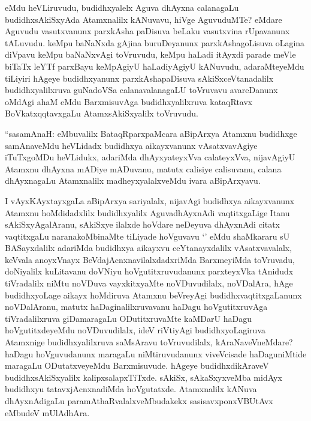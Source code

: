 \begin{artha}%
\stext eMdu heVLiruvudu, budidhxyalelx Aguva dhAyxna calanagaLu budidhxsAkiSxyAda Atamxnalilx kANuvavu, hiVge AguvuduMTe? eMdare Aguvudu vasutxvanunx parxkAsha paDisuva beLaku vasutxvina rUpavanunx tALuvudu. keMpu baNaNxda gAjina buruDeyanunx parxkAshagoLisuva oLagina diVpavu keMpu baNaNxvAgi toVruvudu, keMpu haLadi itAyxdi parade meVle biTaTx leYTf parxBayu keMpAgiyU haLadiyAgiyU kANuvudu, adaraMteyeMdu tiLiyiri hAgeye budidhxyanunx parxkAshapaDisuva sAkiSxceVtanadalilx budidhxyalilxruva guNadoVSa calanavalanagaLU toVruvavu avareDanunx oMdAgi ahaM eMdu BarxmisuvAga budidhxyalilxruva kataqRtavx BoVkatxqqtavxgaLu AtamxsAkiSxyalilx toVruvudu. 
\end{artha}

\begin{artha}
``sasamAnaH: eMbuvalilx BataqRparxpaMcara aBipArxya Atamxnu budidhxge samAnaveMdu heVLidadx budidhxya aikayxvanunx vAsatxvavAgiye iTuTxgoMDu heVLidukx, adariMda dhAyxyateyxVva calateyxVva, nijavAgiyU Atamxnu dhAyxna mADiye mADuvanu, matutx calisiye calisuvanu, calana dhAyxnagaLu Atamxnalilx madheyxyalalxveMdu ivara aBipArxyavu.

I vAyxKAyxtayxgaLa aBipArxya sariyalalx, nijavAgi budidhxya aikayxvanunx Atamxnu hoMdidadxlilx budidhxyalilx AguvadhAyxnAdi vaqtitxgaLige Itanu sAkiSxyAgalAranu, sAkiSxye ilalxde hoVdare neDeyuva dhAyxnAdi citatx vaqtitxgaLu naranakoMbinaMte tiLiyade hoVguvavu `\stext ' eMdu shaMkararu sU BASayxdalilx adariMda budidhxya aikayxvu ceYtanayxdalilx vAsatxvavalalx, keVvala anoyxVnayx BeVdajAcnxnavilalxdadxriMda BarxmeyiMda toVruvadu, doNiyalilx kuLitavanu doVNiyu hoVgutitxruvudanunx parxteyxVka tAnidudx tiVradalilx niMtu noVDuva vayxkitxyaMte noVDuvudilalx, noVDalAra, hAge budidhxyoLage aikayx hoMdiruva Atamxnu beVreyAgi budidhxvaqtitxgaLanunx noVDalAranu, matutx haDaginalilxruvavanu haDagu hoVgutitxruvAga tiVradalilxruva giDamaragaLu ODutitxruvaMte kaMDarU haDagu hoVgutitxdeyeMdu noVDuvudilalx, ideV riVtiyAgi budidhxyoLagiruva Atamxnige budidhxyalilxruva saMsAravu toVruvudilalx, kAraNaveVneMdare? haDagu hoVguvudanunx maragaLu niMtiruvudanunx viveVcisade haDaguniMtide maragaLu ODutatxveyeMdu Barxmisuvude. hAgeye budidhxdikAraveV budidhxsAkiSxyalilx kalipxsalapxTiTxde. sAkiSx, sAkaSxyxveMba midAyx budidhxyu tatavxjAcnxnadiMda hoVgutatxde. Atamxnalilx kANuva dhAyxnAdigaLu paramAthaRvalalxveMbudakekx sasisavxponxVBUtAvx eMbudeV mUlAdhAra. 
\end{artha}


